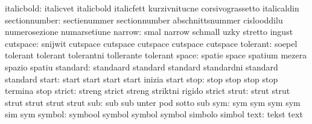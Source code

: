                italicbold: italicvet                 italicbold
                           italicfett                kurzivnitucne
                           corsivograssetto          italicaldin
            sectionnumber: sectienummer              sectionnumber
                           abschnittsnummer          cislooddilu
                           numerosezione             numarsetiune
                   narrow: smal                      narrow
                           schmall                   uzky
                           stretto                   ingust
                 cutspace: snijwit                   cutspace
                           cutspace                  cutspace
                           cutspace                  cutspace %
                 tolerant: soepel                    tolerant
                           tolerant                  tolerantni
                           tollerante                tolerant
                    space: spatie                    space
                           spatium                   mezera
                           spazio                    spatiu %
                 standard: standaard                 standard
                           standard                  standardni
                           standard                  standard
                    start: start                     start
                           start                     start
                           inizia                    start
                     stop: stop                      stop
                           stop                      stop
                           termina                   stop
                   strict: streng                    strict
                           streng                    striktni
                           rigido                    strict
                    strut: strut                     strut
                           strut                     strut
                           strut                     strut
                      sub: sub                       sub
                           unter                     pod
                           sotto                     sub
                      sym: sym                       sym
                           sym                       sym
                           sim                       sym
                   symbol: symbool                   symbol
                           symbol                    symbol
                           simbolo                   simbol
                     text: tekst                     text
